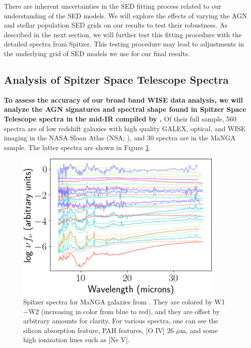 \documentclass[12pt, preprint]{hacked-aastex}
\begin{document}
There are inherent uncertainties in the SED fitting process related to
our understanding of the SED models. We will explore the effects of
varying the AGN and stellar population SED grids on our results to
test their robustness.  As described in the next section, we will
further test this fitting procedure with the detailed spectra from
Spitzer. This testing procedure may lead to adjustments in the
underlying grid of SED models we use for our final results.


\subsection{Analysis of Spitzer Space Telescope Spectra}
\label{sec:spitzer}

{\bf To assess the accuracy of our broad band WISE data analysis, we
  will analyze the AGN signatures and spectral shape found in Spitzer
  Space Telescope spectra in the mid-IR compiled by \cite{lambrides}.}
Of their full sample, 560 spectra are of low redshift galaxies with
high quality GALEX, optical, and WISE imaging in the NASA Sloan Atlas
(NSA; \cite{blanton11a}), and 30 spectra are in the MaNGA sample.  The
latter spectra are shown in Figure \ref{fig:spitzer}.

\begin{figure}[t!]
\includegraphics[width=0.92\textwidth]{all-spitzer.png}
    \caption{
\label{fig:spitzer} \small Spitzer spectra for MaNGA galaxies
from \cite{lambrides}. They are colored by W1$-$W2 (increasing
in color from blue to red), and they are offset by arbitrary
amounts for clarity. For various spectra, one can see 
the silicon absorption  feature, PAH features, [O IV] 26 $\mu$m, 
and some high ionization lines such as [Ne V].
}
\end{figure}
\end{document}

